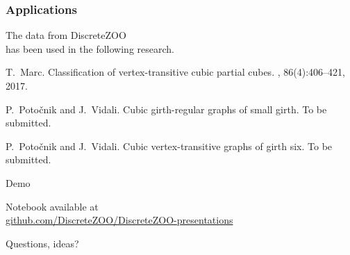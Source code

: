 \documentclass[usepdftitle=false]{beamer}
\newcommand{\con}[1]{\textcolor{zoored}{#1}}
\begin{document}
\frame
{
    \frametitle{Applications}

    The data from \con{DiscreteZOO} \\
    has been used in the following research.

    \medskip

    \begin{thebibliography}{2}
     T.~Marc.
    \newblock Classification of vertex-transitive cubic partial cubes.
    , 86(4):406--421, 2017.

     P.~Potočnik and J.~Vidali.
    \newblock Cubic girth-regular graphs of small girth.
    \newblock To be submitted.

     P.~Potočnik and J.~Vidali.
    \newblock Cubic vertex-transitive graphs of girth six.
    \newblock To be submitted.
    \end{thebibliography}

}

\frame
{
\begin{center}
\huge
\con{Demo} \\

\bigskip
\bigskip

{\large
Notebook available at \\
\con{\href{https://github.com/DiscreteZOO/DiscreteZOO-presentations}{github.com/DiscreteZOO/DiscreteZOO-presentations}}
}
\end{center}
}


\frame
{
\begin{center}
\huge
\con{Questions, ideas?}
\end{center}
}
\end{document}
